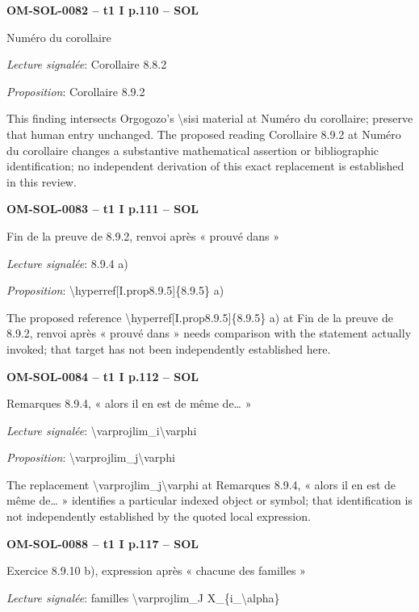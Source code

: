 \par\noindent\textbf{OM-SOL-0082 -- t1 I p.110 -- SOL}\par
Numéro du corollaire\par
\emph{Lecture signalée}: Corollaire 8.8.2\par
\emph{Proposition}: Corollaire 8.9.2\par
This finding intersects Orgogozo's \textbackslash{}sisi material at Numéro du corollaire; preserve that human entry unchanged. The proposed reading Corollaire 8.9.2 at Numéro du corollaire changes a substantive mathematical assertion or bibliographic identification; no independent derivation of this exact replacement is established in this review.\par
\par\noindent\textbf{OM-SOL-0083 -- t1 I p.111 -- SOL}\par
Fin de la preuve de 8.9.2, renvoi après « prouvé dans »\par
\emph{Lecture signalée}: 8.9.4 a)\par
\emph{Proposition}: \textbackslash{}hyperref[I.prop8.9.5]\{8.9.5\} a)\par
The proposed reference \textbackslash{}hyperref[I.prop8.9.5]\{8.9.5\} a) at Fin de la preuve de 8.9.2, renvoi après « prouvé dans » needs comparison with the statement actually invoked; that target has not been independently established here.\par
\par\noindent\textbf{OM-SOL-0084 -- t1 I p.112 -- SOL}\par
Remarques 8.9.4, « alors il en est de même de… »\par
\emph{Lecture signalée}: \textbackslash{}varprojlim\_i\textbackslash{}varphi\par
\emph{Proposition}: \textbackslash{}varprojlim\_j\textbackslash{}varphi\par
The replacement \textbackslash{}varprojlim\_j\textbackslash{}varphi at Remarques 8.9.4, « alors il en est de même de… » identifies a particular indexed object or symbol; that identification is not independently established by the quoted local expression.\par
\par\noindent\textbf{OM-SOL-0088 -- t1 I p.117 -- SOL}\par
Exercice 8.9.10 b), expression après « chacune des familles »\par
\emph{Lecture signalée}: familles \textbackslash{}varprojlim\_J X\_\{i\_\textbackslash{}alpha\}\par
